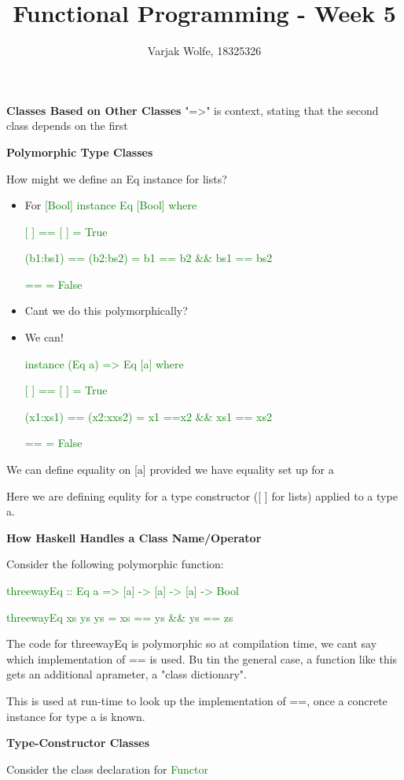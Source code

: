 \documentclass{article}
\title{Functional Programming - Week 5}
\author{Varjak Wolfe, 18325326}
\begin{document}
\textbf{Classes Based on Other Classes}
"=>" is context, stating that the second class depends on the first

\textbf{Polymorphic Type Classes}

How might we define an Eq instance for lists?

\begin{itemize}
\item For \textcolor{green}{[Bool]}
\textcolor{green}{instance Eq [Bool] where}

\textcolor{green}{[ ] == [ ] = True}

\textcolor{green}{(b1:bs1) == (b2:bs2) = b1 == b2 \&\& bs1 == bs2}

\textcolor{green}{\textunderscore == \textunderscore = False}

\item Cant we do this polymorphically?

\item We can!

\textcolor{green}{instance (Eq a) => Eq [a] where}

\textcolor{green}{[ ] == [ ] = True}

\textcolor{green}{(x1:xs1) == (x2:xxs2) = x1 ==x2 \&\& xs1 == xs2}

\textcolor{green}{\textunderscore == \textunderscore = False}
\end{itemize}

We can define equality on [a] provided we have equality set up for a

Here we are defining equlity for a type constructor ([ ] for lists) applied to a type a.


\textbf{How Haskell Handles a Class Name/Operator}

Consider the following polymorphic function:

\textcolor{green}{threewayEq  ::  Eq a => [a] -> [a] -> [a] -> Bool}

\textcolor{green}{threewayEq  xs  ys  ys = xs == ys \&\& ys == zs}

The code for threewayEq is polymorphic so at compilation time, we cant say which implementation of == is used. Bu tin the general case, a function like this gets an additional aprameter, a "class dictionary".

This is used at run-time to look up the implementation of ==, once a concrete instance for type a is known.


\textbf{Type-Constructor Classes}

Consider the class declaration for \textcolor{green}{Functor}
\end{document}
